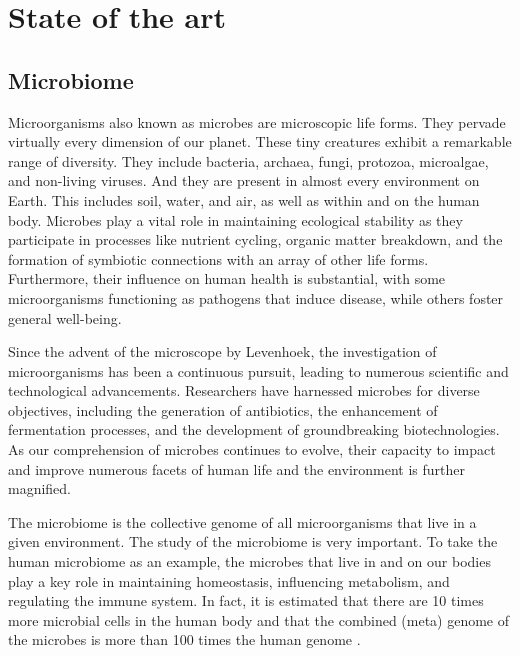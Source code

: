 \section{State of the art}
    \subsection{Microbiome}
            Microorganisms also known as microbes are microscopic life forms. They pervade virtually every dimension of our planet. These tiny creatures exhibit a remarkable range of diversity. They include bacteria, archaea, fungi, protozoa, microalgae, and non-living viruses. And they are present in almost every environment on Earth. This includes soil, water, and air, as well as within and on the human body. Microbes play a vital role in maintaining ecological stability as they participate in processes like nutrient cycling, organic matter breakdown, and the formation of symbiotic connections with an array of other life forms. Furthermore, their influence on human health is substantial, with some microorganisms functioning as pathogens that induce disease, while others foster general well-being\cite{brock2003brock}.
    
            Since the advent of the microscope by Levenhoek, the investigation of microorganisms has been a continuous pursuit, leading to numerous scientific and technological advancements. Researchers have harnessed microbes for diverse objectives, including the generation of antibiotics, the enhancement of fermentation processes, and the development of groundbreaking biotechnologies. As our comprehension of microbes continues to evolve, their capacity to impact and improve numerous facets of human life and the environment is further magnified.
        
            The microbiome is the collective genome of all microorganisms that live in a given environment. The study of the microbiome is very important. To take the human microbiome as an example, the microbes that live in and on our bodies play a key role in maintaining homeostasis, influencing metabolism, and regulating the immune system. In fact, it is estimated that there are 10 times more microbial cells in the human body and that the combined (meta) genome of the microbes is more than 100 times the human genome \cite{yang2009more}.
            
